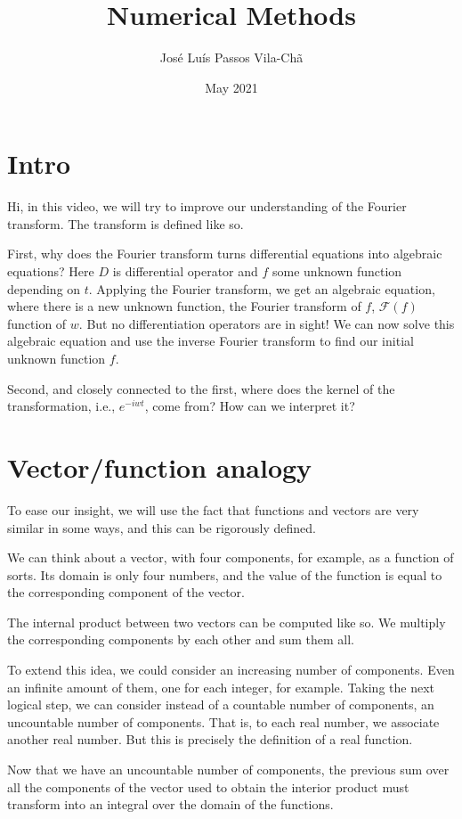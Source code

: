 \documentclass{article}
\title{Numerical Methods}
\author{José Luís Passos Vila-Chã}
\date{May 2021}
\begin{document}
\section{Intro}

Hi, in this video, we will try to improve our understanding of the Fourier transform.
The transform is defined like so.



First, why does the Fourier transform turns differential equations into algebraic equations?
Here $D$ is differential operator and $f$ some unknown function depending on $t$.
Applying the Fourier transform, we get an algebraic equation, where there is a new unknown function, the Fourier transform of $f$,
$\mathcal F(f)$ function of $w$.
But no differentiation operators are in sight!
We can now solve this algebraic equation and use the inverse Fourier transform to find our initial unknown function $f$.

Second, and closely connected to the first, where does the kernel of the transformation, i.e., $e^{-iwt}$, come from?
How can we interpret it?

\section{Vector/function analogy}

To ease our insight, we will use the fact that functions and vectors are very similar in some ways, and this can be rigorously defined.

We can think about a vector, with four components, for example, as a function of sorts.
Its domain is only four numbers, and the value of the function is equal to the corresponding component of the vector.

The internal product between two vectors can be computed like so.
We multiply the corresponding components by each other and sum them all.

To extend this idea, we could consider an increasing number of components.
Even an infinite amount of them, one for each integer, for example.
Taking the next logical step, we can consider instead of a countable number of components, an uncountable number of components.
That is, to each real number, we associate another real number.
But this is precisely the definition of a real function.

Now that we have an uncountable number of components, the previous sum over all the components of the vector used to obtain the interior product must transform into an integral over the domain of the functions.
\end{document}
